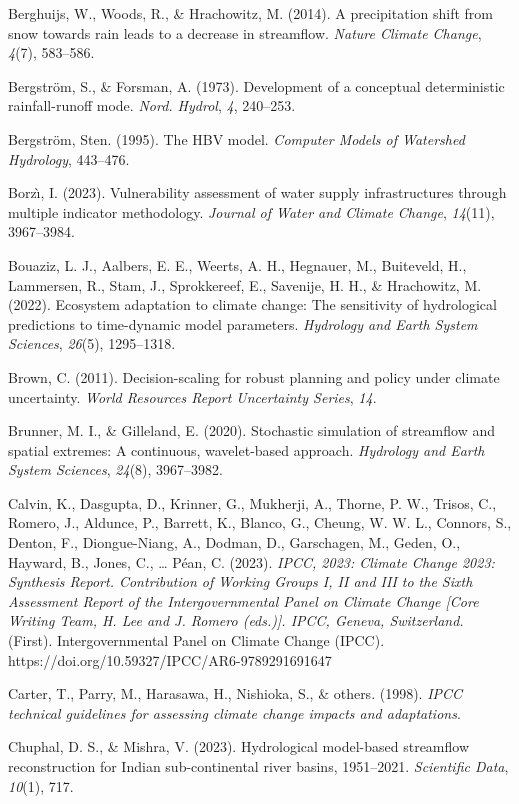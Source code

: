 \documentclass[
]{article}
\begin{document}
Berghuijs, W., Woods, R., \& Hrachowitz, M. (2014). A precipitation
shift from snow towards rain leads to a decrease in streamflow.
\emph{Nature Climate Change}, \emph{4}(7), 583--586.

Bergström, S., \& Forsman, A. (1973). Development of a conceptual
deterministic rainfall-runoff mode. \emph{Nord. Hydrol}, \emph{4},
240--253.

Bergström, Sten. (1995). The HBV model. \emph{Computer Models of
Watershed Hydrology}, 443--476.

Borzı̀, I. (2023). Vulnerability assessment of water supply
infrastructures through multiple indicator methodology. \emph{Journal of
Water and Climate Change}, \emph{14}(11), 3967--3984.

Bouaziz, L. J., Aalbers, E. E., Weerts, A. H., Hegnauer, M., Buiteveld,
H., Lammersen, R., Stam, J., Sprokkereef, E., Savenije, H. H., \&
Hrachowitz, M. (2022). Ecosystem adaptation to climate change: The
sensitivity of hydrological predictions to time-dynamic model
parameters. \emph{Hydrology and Earth System Sciences}, \emph{26}(5),
1295--1318.

Brown, C. (2011). Decision-scaling for robust planning and policy under
climate uncertainty. \emph{World Resources Report Uncertainty Series},
\emph{14}.

Brunner, M. I., \& Gilleland, E. (2020). Stochastic simulation of
streamflow and spatial extremes: A continuous, wavelet-based approach.
\emph{Hydrology and Earth System Sciences}, \emph{24}(8), 3967--3982.

Calvin, K., Dasgupta, D., Krinner, G., Mukherji, A., Thorne, P. W.,
Trisos, C., Romero, J., Aldunce, P., Barrett, K., Blanco, G., Cheung, W.
W. L., Connors, S., Denton, F., Diongue-Niang, A., Dodman, D.,
Garschagen, M., Geden, O., Hayward, B., Jones, C., \ldots{} Péan, C.
(2023). \emph{IPCC, 2023: Climate Change 2023: Synthesis Report.
Contribution of Working Groups I, II and III to the Sixth Assessment
Report of the Intergovernmental Panel on Climate Change {[}Core Writing
Team, H. Lee and J. Romero (eds.){]}. IPCC, Geneva, Switzerland.}
(First). Intergovernmental Panel on Climate Change (IPCC).
https://doi.org/10.59327/IPCC/AR6-9789291691647

Carter, T., Parry, M., Harasawa, H., Nishioka, S., \& others. (1998).
\emph{IPCC technical guidelines for assessing climate change impacts and
adaptations}.

Chuphal, D. S., \& Mishra, V. (2023). Hydrological model-based
streamflow reconstruction for Indian sub-continental river basins,
1951--2021. \emph{Scientific Data}, \emph{10}(1), 717.
\end{document}
